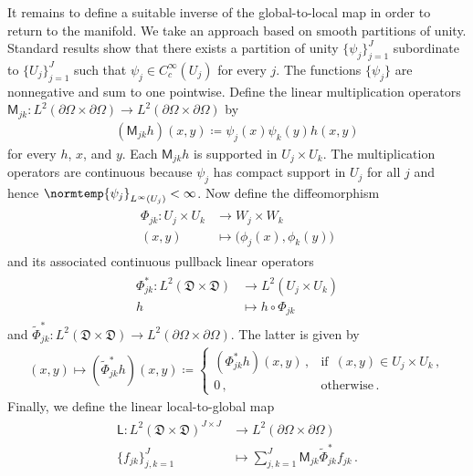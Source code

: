 \documentclass[pdflatex,sn-mathphys-num]{sn-jnl-preprint}
\newcommand{\sfL}{\mathsf{L}}
\newcommand{\sfM}{\mathsf{M}}
\newcommand{\pOmega}{{\partial\Omega}}
\newcommand{\norm}{\normtemp}
\newcommand{\defeq}{\coloneqq} %
\theoremstyle{thmstyleone}%
\theoremstyle{thmstyletwo}%
\theoremstyle{thmstylethree}%
\numberwithin{equation}{section}
\numberwithin{theorem}{section}
\begin{document}
It remains to define a suitable inverse of the global-to-local map in order to return to the manifold. We take an approach based on smooth partitions of unity. Standard results \cite[Prop.~13.6, p.~146]{tu2011manifold} show that there exists a partition of unity $\{\psi_j\}_{j=1}^J$ subordinate to $\{U_j\}_{j=1}^J$ such that $\psi_j\in C_c^\infty(U_j)$ for every $j$. The functions $\{\psi_j\}$ are nonnegative and sum to one pointwise.
Define the linear multiplication operators $\sfM_{jk}\colon L^2(\pOmega\times\pOmega) \to  L^2(\pOmega\times\pOmega)$ by
\begin{align}\label{eqn:multiplication}
    (\sfM_{jk} h)(x,y)\defeq \psi_j(x)\psi_k(y)h(x,y)
\end{align}
for every $h$, $x$, and $y$. Each $\sfM_{jk}h$ is supported in $U_j\times U_k$.
The multiplication operators are continuous because $\psi_j$ has compact support in $U_j$ for all $j$ and hence $\norm{\psi_j}_{L^\infty(U_j)}<\infty$.
Now define the diffeomorphism
\begin{align}
    \begin{split}
        \Phi_{jk}\colon U_j\times U_k&\to W_j\times W_k\\
        (x,y)&\mapsto \bigl(\phi_j(x),\phi_k(y)\bigr)
    \end{split}
\end{align}
and its associated continuous pullback linear operators
\begin{align}
    \begin{split}
        \Phi_{jk}^*\colon L^2(\mathfrak{D}\times\mathfrak{D}) &\to L^2(U_j\times U_k)\\
        h&\mapsto h\circ \Phi_{jk}
    \end{split}
\end{align}
and $\widetilde{\Phi}_{jk}^*\colon L^2(\mathfrak{D}\times\mathfrak{D})\to L^2(\pOmega\times\pOmega)$. The latter is given by
\begin{align}
    (x,y)\mapsto (\widetilde{\Phi}_{jk}^* h)(x,y)\defeq
    \begin{cases}
        ({\Phi}_{jk}^* h)(x,y)\, , & \text{if }\, (x,y)\in U_j\times U_k\,,\\
        0\, , & \text{otherwise}\,.
    \end{cases}
\end{align}
Finally, we define the linear local-to-global map
\begin{align}\label{eqn:local_to_global}
    \begin{split}
        {\sfL}\colon L^2(\mathfrak{D}\times \mathfrak{D})^{J\times J}&\to L^2(\pOmega\times\pOmega)\\
        \bigl\{f_{jk}\}_{j,k=1}^J&\mapsto  \sum_{j,k=1}^J \sfM_{jk}\widetilde{\Phi}_{jk}^* f_{jk}\,.
    \end{split}
\end{align}
\end{document}
